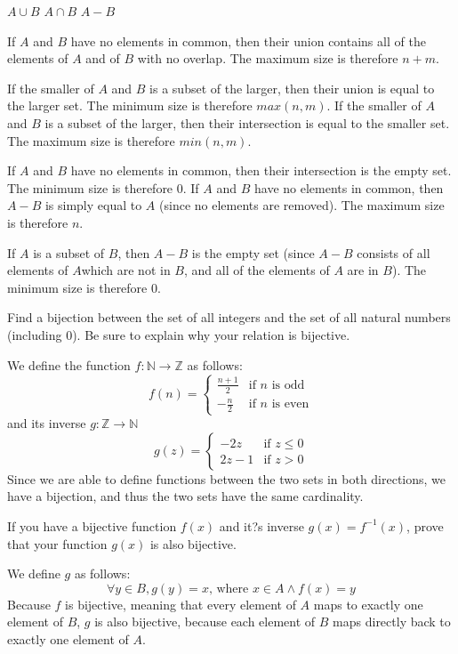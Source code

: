 \documentclass[solution, letterpaper]{cs20}
\begin{document}
\subproblem $A \cup B$
\subproblem $A \cap B$
\subproblem $A - B$
 
\begin{solution}
\subsolution If $A$ and $B$ have no elements in common, then their union contains all of the elements of $A$ and of $B$ with no overlap. The maximum size is therefore $n + m$. 

\noindent If the smaller of $A$ and $B$ is a subset of the larger, then their union is equal to the larger set. The minimum size is therefore $max(n, m)$.
\subsolution If the smaller of $A$ and $B$ is a subset of the larger, then their intersection is equal to the smaller set. The maximum size is therefore $min(n, m)$.

\noindent If $A$ and $B$ have no elements in common, then their intersection is the empty set. The minimum size is therefore 0.
\subsolution If $A$ and $B$ have no elements in common, then $A - B$ is simply equal to $A$ (since no elements are removed). The maximum size is therefore $n$.

\noindent If $A$ is a subset of $B$, then $A - B$ is the empty set (since $A - B$ consists of all elements of $A$which are not in $B$, and all of the elements of $A$ are in $B$). The minimum size is therefore 0.
\end{solution}

Find a bijection between the set of all integers and the set of all natural numbers (including 0). Be sure to explain why your relation is bijective.

\begin{solution}
We define the function $f:\mathbb{N} \to \mathbb{Z}$ as follows: 
$$f(n) = \begin{cases} \frac{n+1}{2} & \mbox{if }n\mbox{ is odd} \\ -\frac{n}{2} & \mbox{if }n\mbox{ is even} \end{cases}$$
and its inverse $g:\mathbb{Z} \to \mathbb{N}$
$$g(z) = \begin{cases} -2z & \mbox{if }z \leq 0 \\ 2z-1& \mbox{if }z > 0 \end{cases}$$
Since we are able to define functions between the two sets in both directions, we have a bijection, and thus the two sets have the same cardinality.
\end{solution}
 
 
If you have a bijective function $f(x)$ and it?s inverse $g(x) = f^{-1}(x)$, prove that your function $g(x)$ is also bijective.

\begin{solution}
\noindent We define $g$ as follows:
$$\forall y \in B, g(y) = x\text{, where }x \in A \wedge f(x) = y$$
\noindent Because $f$ is bijective, meaning that every element of $A$ maps to exactly one element of $B$, $g$ is also bijective, because each element of $B$ maps directly back to exactly one element of $A$.

\end{solution}
\end{document}
